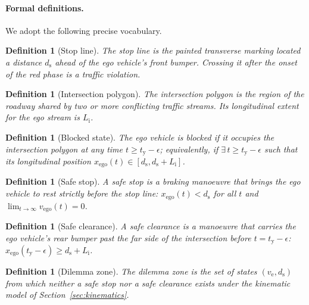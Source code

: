 \documentclass[conference, a4paper]{IEEEtran}
\theoremstyle{plain}
\newtheorem{definition}[theorem]{Definition}
\newcommand{\ds}{d_{\mathrm{s}}}
\newcommand{\tred}{t_{\mathrm{y}}}
\newcommand{\Li}{L_{\mathrm{i}}}
\newcommand{\ve}{v_{\mathrm{e}}}
\begin{document}
\paragraph{Formal definitions.} We adopt the following precise vocabulary.

\begin{definition}[Stop line]
\label{def:stopline}
The stop line is the painted transverse marking located a distance $\ds$
ahead of the ego vehicle's front bumper. Crossing it after the onset of the
red phase is a traffic violation.
\end{definition}

\begin{definition}[Intersection polygon]
\label{def:intersection}
The intersection polygon is the region of the roadway shared by two or more
conflicting traffic streams. Its longitudinal extent for the ego stream is
$\Li$.
\end{definition}

\begin{definition}[Blocked state]
\label{def:blocked}
The ego vehicle is \emph{blocked} if it occupies the intersection polygon at
any time $t \geq \tred - \epsilon$; equivalently, if
$\exists\, t \geq \tred - \epsilon$ such that its longitudinal position
$x_{\mathrm{ego}}(t) \in [\ds, \ds + \Li]$.
\end{definition}

\begin{definition}[Safe stop]
\label{def:safestop}
A \emph{safe stop} is a braking manoeuvre that brings the ego vehicle to rest
strictly before the stop line: $x_{\mathrm{ego}}(t) < \ds$ for all $t$ and
$\lim_{t\to\infty} v_{\mathrm{ego}}(t) = 0$.
\end{definition}

\begin{definition}[Safe clearance]
\label{def:safeclear}
A \emph{safe clearance} is a manoeuvre that carries the ego vehicle's rear
bumper past the far side of the intersection before
$t = \tred - \epsilon$: $x_{\mathrm{ego}}(\tred - \epsilon) \geq \ds + \Li$.
\end{definition}

\begin{definition}[Dilemma zone]
\label{def:dilemma}
The \emph{dilemma zone} is the set of states $(\ve, \ds)$ from which neither
a safe stop nor a safe clearance exists under the kinematic model of
Section~\ref{sec:kinematics}.
\end{definition}
\end{document}
